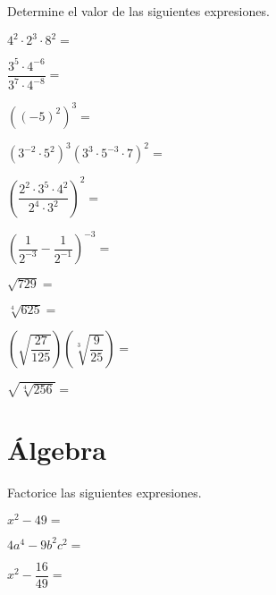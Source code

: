 \documentclass[sin curso]{srs}
\begin{document}
Determine el valor de las siguientes expresiones.
\begin{preguntas}
  \pregunta $4^2\cdot 2^3\cdot 8^2 =$
  \begin{malla}[height=4cm]
  \end{malla}
  \pregunta $\dfrac{3^5\cdot 4^{-6}}{3^7\cdot 4^{-8}} =$
  \begin{malla}[height=4cm]
  \end{malla}
  \pregunta $\left(\left(-5\right)^2\right)^3 =$
  \begin{malla}[height=4cm]
  \end{malla}
  \pregunta $\left(3^{-2}\cdot 5^2\right)^3\left(3^3\cdot 5^{-3}\cdot 7\right)^2 =$
  \begin{malla}[height=5cm]
  \end{malla}
  \pregunta $\left(\dfrac{2^2\cdot 3^5 \cdot 4^2}{2^4\cdot 3^2}\right)^2 =$
  \begin{malla}[height=6cm]
  \end{malla}
  \pregunta $\left(\dfrac{1}{2^{-3}}-\dfrac{1}{2^{-1}}\right)^{-3} =$
  \begin{malla}[height=6cm]
  \end{malla}
  \pregunta $\sqrt{729} =$
  \begin{malla}[height=5cm]
  \end{malla}
  \pregunta $\sqrt[4]{625} =$
  \begin{malla}[height=6cm]
  \end{malla}
  \pregunta $\left(\sqrt{\dfrac{27}{125}}\right)\left(\sqrt[3]{\dfrac{9}{25}}\right) =$
  \begin{malla}[height=6cm]
  \end{malla}
  \pregunta $\sqrt{\sqrt[4]{256}} =$
  \begin{malla}[height=5cm]
  \end{malla}

\end{preguntas}

\section{Álgebra}

Factorice las siguientes expresiones.
\begin{preguntas}
  \pregunta $x^2-49 =$
  \begin{malla}[height=3cm]
  \end{malla}
  \pregunta $4a^4-9b^2c^2 =$
  \begin{malla}[height=5cm]
  \end{malla}
  \pregunta $x^2 -\dfrac{16}{49} =$
  \begin{malla}[height=5cm]
  \end{malla}
\end{preguntas}
\end{document}
